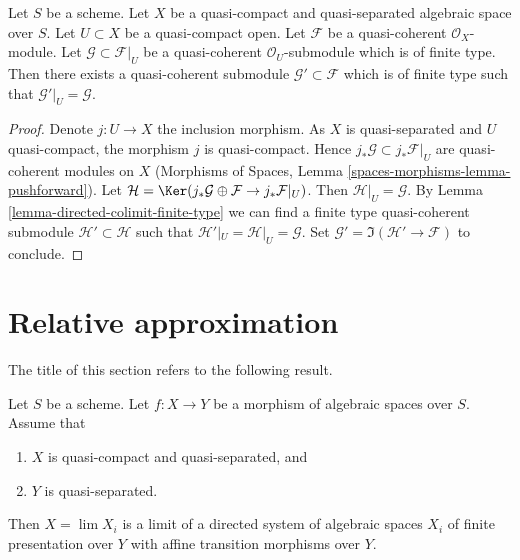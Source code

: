 \begin{lemma}
\label{lemma-extend}
Let $S$ be a scheme.
Let $X$ be a quasi-compact and quasi-separated algebraic space over $S$.
Let $U \subset X$ be a quasi-compact open.
Let $\mathcal{F}$ be a quasi-coherent $\mathcal{O}_X$-module.
Let $\mathcal{G} \subset \mathcal{F}|_U$ be a quasi-coherent
$\mathcal{O}_U$-submodule which is of finite type. Then
there exists a quasi-coherent submodule $\mathcal{G}' \subset \mathcal{F}$
which is of finite type such that $\mathcal{G}'|_U = \mathcal{G}$.
\end{lemma}

\begin{proof}
Denote $j : U \to X$ the inclusion morphism. As $X$ is quasi-separated
and $U$ quasi-compact, the morphism $j$ is quasi-compact. Hence
$j_*\mathcal{G} \subset j_*\mathcal{F}|_U$ are quasi-coherent modules
on $X$ (Morphisms of Spaces, Lemma
\ref{spaces-morphisms-lemma-pushforward}).
Let $\mathcal{H} =
\Ker(j_*\mathcal{G} \oplus \mathcal{F} \to j_*\mathcal{F}|_U)$.
Then $\mathcal{H}|_U = \mathcal{G}$. By
Lemma \ref{lemma-directed-colimit-finite-type}
we can find a finite type quasi-coherent submodule
$\mathcal{H}' \subset \mathcal{H}$ such that
$\mathcal{H}'|_U = \mathcal{H}|_U = \mathcal{G}$.
Set $\mathcal{G}' = \Im(\mathcal{H}' \to \mathcal{F})$
to conclude.
\end{proof}









\section{Relative approximation}
\label{section-relative-approximation}

\noindent
The title of this section refers to the following result.

\begin{lemma}
\label{lemma-relative-approximation}
Let $S$ be a scheme. Let $f : X \to Y$ be a morphism of algebraic spaces
over $S$. Assume that
\begin{enumerate}
\item $X$ is quasi-compact and quasi-separated, and
\item $Y$ is quasi-separated.
\end{enumerate}
Then $X = \lim X_i$ is a limit of a directed system of algebraic spaces
$X_i$ of finite presentation over $Y$ with affine transition morphisms
over $Y$.
\end{lemma}

